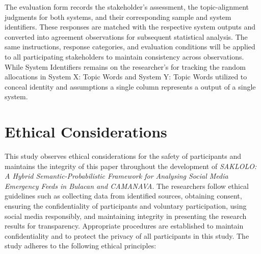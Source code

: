 The evaluation form records the stakeholder's assessment, the topic-alignment judgments for both systems, and their corresponding sample and system identifiers. These responses are matched with the respective system outputs and converted into agreement observations for subsequent statistical analysis. The same instructions, response categories, and evaluation conditions will be applied to all participating stakeholders to maintain consistency across observations. While System Identifiers remains on the researcher's for tracking the random allocations in System X: Topic Words and System Y: Topic Words utilized to conceal identity and assumptions a single column represents a output of a single system.

\section*{Ethical Considerations}

This study observes ethical considerations for the safety of participants and
maintains the integrity of this paper throughout the development of
\emph{SAKLOLO: A Hybrid Semantic-Probabilistic Framework for Analysing Social
	Media Emergency Feeds in Bulacan and CAMANAVA}. The researchers follow
ethical guidelines such as collecting data from identified sources, obtaining
consent, ensuring the confidentiality of participants and voluntary
participation, using social media responsibly, and maintaining integrity in
presenting the research results for transparency. Appropriate procedures are
established to maintain confidentiality and to protect the privacy of all
participants in this study. The study adheres to the following ethical
principles:

